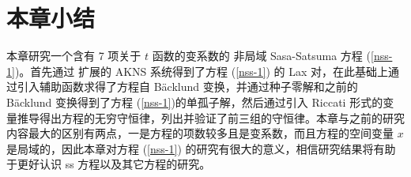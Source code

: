 \section{本章小结}
本章研究一个含有 7 项关于 $t$ 函数的变系数的 非局域 Sasa-Satsuma 方程 (\ref{nss-1})。首先通过 扩展的 AKNS 系统得到了方程 (\ref{nss-1}) 的 Lax 对，在此基础上通过引入辅助函数求得了方程自 B\"{a}cklund 变换，并通过种子零解和之前的 B\"{a}cklund 变换得到了方程 (\ref{nss-1})的单孤子解，然后通过引入 Riccati 形式的变量推导得出方程的无穷守恒律，列出并验证了前三组的守恒律。本章与之前的研究内容最大的区别有两点，一是方程的项数较多且是变系数，而且方程的空间变量 $x$ 是局域的，因此本章对方程 (\ref{nss-1}) 的研究有很大的意义，相信研究结果将有助于更好认识 ss 方程以及其它方程的研究。